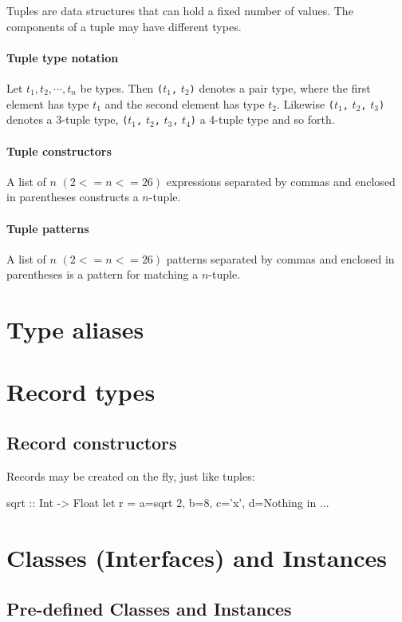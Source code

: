 Tuples are data structures that can hold a fixed number of values. The
components of a tuple may have different types.

\paragraph*{Tuple type notation}

Let $t_1, t_2, \cdots, t_n$ be types. Then
\texttt{(}$t_1$\texttt{,} $t_2$\texttt{)} denotes a pair type, where
the first element has type $t_1$ and the second element has type
$t_2$. Likewise \texttt{(}$t_1$\texttt{,} $t_2$\texttt{,}
$t_3$\texttt{)} denotes a 3-tuple type,
\texttt{(}$t_1$\texttt{,} $t_2$\texttt{,}
$t_3$\texttt{,} $t_4$\texttt{)} a 4-tuple type and so forth.

\paragraph*{Tuple constructors}

A list of $n$ $(2<=n<=26)$ expressions separated by commas and enclosed in
parentheses constructs a $n$-tuple.

\paragraph*{Tuple patterns} \label{tuplepattern}

A list of $n$ $(2<=n<=26)$ patterns separated by commas and enclosed in
parentheses is a pattern for matching a $n$-tuple.

\section{Type aliases}

\section{Record types}
\subsection{Record constructors}
Records may be created on
the fly, just like tuples:
\begin{code}
sqrt :: Int -> Float
let
  r = { a=sqrt 2, b=8, c='x', d=Nothing }
in ...
\end{code}


\section{Classes (Interfaces) and Instances}
\subsection{Pre-defined Classes and Instances}
